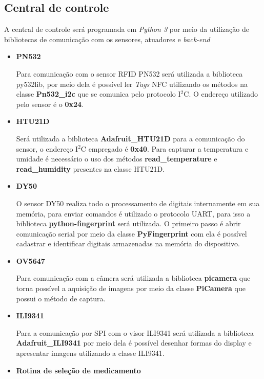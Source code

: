 \subsection{Central de controle}
A central de controle será programada em \textit{Python 3} por meio da utilização de bibliotecas de comunicação com os sensores, atuadores e \textit{back-end}
\begin{itemize}
    \item \textbf{PN532}
    
    Para comunicação com o sensor RFID PN532 será utilizada a biblioteca py532lib, por meio dela é possível ler \textit{Tags} NFC utilizando os métodos na classe \textbf{Pn532\_i2c} que se comunica pelo protocolo I$^2$C. O endereço utilizado pelo sensor é o \textbf{0x24}. 
    
    \item \textbf{HTU21D}
    
    Será utilizada a biblioteca \textbf{Adafruit\_HTU21D} para a comunicação do sensor, o endereço I$^2$C empregado é \textbf{0x40}. Para capturar a temperatura e umidade é necessário o uso dos métodos  \textbf{read\_temperature} e \textbf{read\_humidity} presentes na classe HTU21D.
    
    \item \textbf{DY50}
    
    O sensor DY50 realiza todo o processamento de digitais internamente em sua memória, para enviar comandos é utilizado o protocolo UART, para isso a biblioteca \textbf{python-fingerprint} será utilizada. O primeiro passo é abrir comunicação serial por meio da classe \textbf{PyFingerprint} com ela é possível cadastrar e identificar digitais armazenadas na memória do dispositivo.
    
    \item \textbf{OV5647}
    
    Para comunicação com a câmera será utilizada a biblioteca \textbf{picamera} que torna possível a aquisição de imagens por meio da classe \textbf{PiCamera} que possui o método de captura.
    
    \item \textbf{ILI9341}
    
    Para a comunicação por SPI com o visor ILI9341 será utilizada a biblioteca \textbf{Adafruit\_ILI9341} por meio dela é possível desenhar formas do display e apresentar imagens utilizando a classe ILI9341.
    
    \item \textbf{Rotina de seleção de medicamento}
    

\end{itemize}
